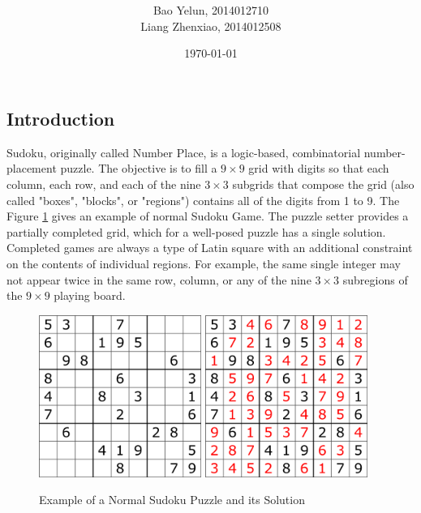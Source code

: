 \documentclass[12pt]{article}
\title{\textmd{\bf \Title}}
\date{\today}
\author{Bao Yelun,  2014012710\\Liang Zhenxiao, 2014012508}
\begin{document}
\begin{spacing}{1.1}
\maketitle \thispagestyle{empty}

\section{Introduction}

Sudoku, originally called Number Place, is a logic-based, combinatorial number-placement puzzle. The objective is to fill a $ 9\times9 $ grid with digits so that each column, each row, and each of the nine $ 3\times3 $ subgrids that compose the grid (also called "boxes", "blocks", or "regions") contains all of the digits from 1 to 9. The Figure \ref{Fig:NormalSudoku} gives an example of normal Sudoku Game. The puzzle setter provides a partially completed grid, which for a well-posed puzzle has a single solution. Completed games are always a type of Latin square with an additional constraint on the contents of individual regions. For example, the same single integer may not appear twice in the same row, column, or any of the nine $ 3\times3 $ subregions of the $ 9\times9 $ playing board.

\begin{figure}[h]
	\centering
	\includegraphics[width=150pt]{pic1.png}
	\hspace{30pt}
	\includegraphics[width=150pt]{pic2.png}
	\caption{Example of a Normal Sudoku Puzzle and its Solution}
	\label{Fig:NormalSudoku}
\end{figure}


\end{spacing}
\end{document}
